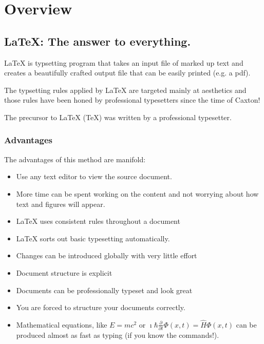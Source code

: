 \chapter{Overview}
\label{chap:overview}
\section{LaTeX: The answer to everything.}
LaTeX is typsetting program that takes an input file of marked up text and creates a beautifully crafted output file that can be easily printed (e.g. a pdf). 

The typsetting rules applied by LaTeX are targeted mainly at aesthetics and those rules have been honed by professional typesetters since the time of Caxton! 

The precursor to LaTeX (TeX) was written by a professional typesetter.

\subsection{Advantages}

The advantages of this method are manifold:

\begin{itemize}

\item Use any text editor to view the source document.
\item More time can be spent working on the content and not worrying about how text and figures will appear.
\item LaTeX uses consistent rules throughout a document
\item LaTeX sorts out basic typesetting automatically. 
\item Changes can be introduced globally with very little effort
\item Document structure is explicit
\item Documents can be professionally typeset and look great
\item You are forced to structure your documents correctly.
\item Mathematical equations, like $E=mc^2$ or $\imath\hbar\frac{\partial}{\partial t}\Phi (x, t) = \hat{H}\Phi (x, t)$ can be produced almost as fast as typing (if you know the commands!).
\end{itemize}

